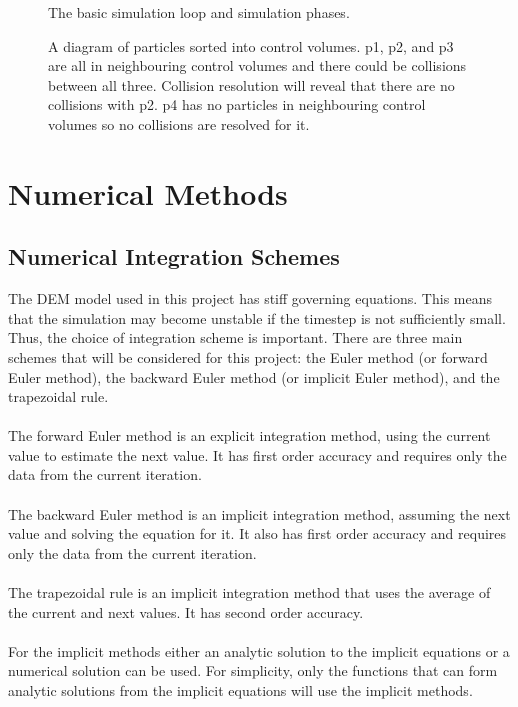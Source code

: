 \documentclass[a4paper,11pt,titlepage]{report}
\begin{document}
\begin{figure}[!htb]
\centering

\caption{The basic simulation loop and simulation phases.}
\label{fig:algorithm_flowchart}
\end{figure}
\begin{figure}[!htb]
\centering

\caption{A diagram of particles sorted into control volumes. p1, p2, and p3 are all in neighbouring control volumes and there could be collisions between all three. Collision resolution will reveal that there are no collisions with p2. p4 has no particles in neighbouring control volumes so no collisions are resolved for it.}
\label{fig:control_volumes}
\end{figure}
\chapter{Numerical Methods}
\label{ch:Numerical Methods}
\section{Numerical Integration Schemes}
The DEM model used in this project has stiff governing equations. This means that the simulation may become unstable if the timestep is not sufficiently small. Thus, the choice of integration scheme is important. There are three main schemes that will be considered for this project: the Euler method (or forward Euler method), the backward Euler method (or implicit Euler method), and the trapezoidal rule.
\\\\The forward Euler method is an explicit integration method, using the current value to estimate the next value. It has first order accuracy and requires only the data from the current iteration.
\\\\The backward Euler method is an implicit integration method, assuming the next value and solving the equation for it. It also has first order accuracy and requires only the data from the current iteration.
\\\\The trapezoidal rule is an implicit integration method that uses the average of the current and next values. It has second order accuracy.
\\\\For the implicit methods either an analytic solution to the implicit equations or a numerical solution can be used. For simplicity, only the functions that can form analytic solutions from the implicit equations will use the implicit methods.
\end{document}
